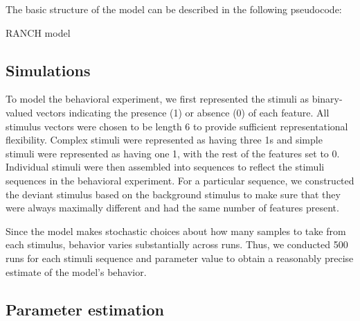 \documentclass[10pt, letterpaper]{article}
\begin{document}
The basic structure of the model can be described in the following
pseudocode:

\begin{algorithm}
  \caption*{RANCH model}\label{msn}
  \begin{algorithmic}
  \NoDo{}
    \NoThen{}
    \EndIf
    \EndWhile
  \EndFor
\end{algorithmic}
  \end{algorithm}

\hypertarget{simulations}{%
\subsection{Simulations}\label{simulations}}

To model the behavioral experiment, we first represented the stimuli as
binary-valued vectors indicating the presence (1) or absence (0) of each
feature. All stimulus vectors were chosen to be length 6 to provide
sufficient representational flexibility. Complex stimuli were
represented as having three 1s and simple stimuli were represented as
having one 1, with the rest of the features set to 0. Individual stimuli
were then assembled into sequences to reflect the stimuli sequences in
the behavioral experiment. For a particular sequence, we constructed the
deviant stimulus based on the background stimulus to make sure that they
were always maximally different and had the same number of features
present.

Since the model makes stochastic choices about how many samples to take
from each stimulus, behavior varies substantially across runs. Thus, we
conducted 500 runs for each stimuli sequence and parameter value to
obtain a reasonably precise estimate of the model's behavior.

\hypertarget{parameter-estimation}{%
\subsection{Parameter estimation}\label{parameter-estimation}}
\end{document}
